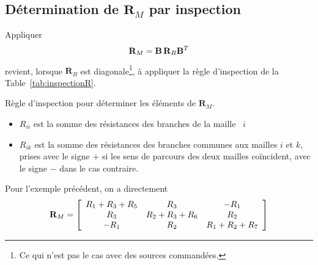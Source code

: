 \subsection{Détermination de $\mathbf{R}_M$ par inspection}
Appliquer $$\mathbf{R}_M = {\bf B}\,{\bf R}_B {\bf B}^T$$ revient, lorsque $\mathbf{R}_B$ est diagonale\footnote{Ce qui n'est pas le cas avec des sources commandées.}, à appliquer la règle d'inspection de la Table~\ref{tab:inspectionR}.	 
\begin{table}[ht]
	\caption{Règle d'inspection pour déterminer les éléments de $\mathbf{R}_M$.}\label{tab:inspectionR}
	\begin{boxedminipage}{\textwidth}
		\begin{itemize}
			\item $R_{ii}$ est la somme des résistances des branches de la maille ~$i$
			\item $R_{ik}$ est la somme des résistances des branches communes aux mailles $i$ et $k$, prises avec le signe $+$ si les sens de parcours des deux mailles coïncident, avec le signe $-$ dans le cas contraire.
		\end{itemize}
	\end{boxedminipage}
\end{table}

\begin{testexample}
	Pour l'exemple précédent, on a directement 
	\[
	{\bf R}_M= 
	\left[ \begin{array}{ccc}
	R_1+R_3+R_5 & R_3 & -R_1 \\
	R_3 & R_2+R_3+R_6 & R_2 \\
	-R_1 & R_2 & R_1+R_2+R_7
	\end{array} \right] \]
\end{testexample}

